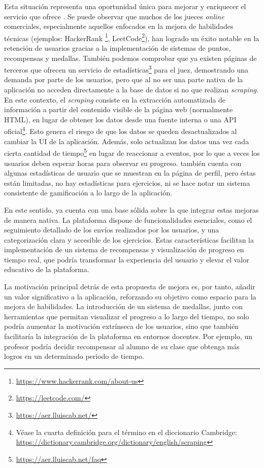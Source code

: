 Esta situación representa una oportunidad única para mejorar y enriquecer el servicio que ofrece \aer. Se puede observar que muchos de los jueces \textit{online} comerciales, especialmente aquellos enfocados en la mejora de habilidades técnicas (ejemplos: HackerRank \footnote{\url{https://www.hackerrank.com/about-us}}, LeetCode\footnote{\url{https://leetcode.com/}}), han logrado un éxito notable en la retención de usuarios gracias a la implementación de sistemas de puntos, recompensas y medallas. También podemos comprobar que ya existen páginas de terceros que ofrecen un servicio de estadísticas\footnote{\url{https://aer.lluiscab.net/}} para el juez, demostrando una demanda por parte de los usuarios, pero que al no ser una parte nativa de la aplicación no acceden directamente a la base de datos si no que realizan \textit{scraping}. En este contexto, el \textit{scraping} consiste en la extracción automatizada de información a partir del contenido visible de la página web (normalmente HTML), en lugar de obtener los datos desde una fuente interna o una API oficial\footnote{Véase la cuarta definición para el término en el diccionario Cambridge: \url{https://dictionary.cambridge.org/dictionary/english/scraping}}. Esto genera el riesgo de que los datos se queden desactualizados al cambiar la UI de la aplicación. Además, solo actualizan los datos una vez cada cierta cantidad de tiempo\footnote{\url{https://aer.lluiscab.net/faq}} en lugar de reaccionar a eventos, por lo que a veces los usuarios deben esperar horas para observar su progreso. \aer también cuenta con algunas estadísticas de usuario que se muestran en la página de perfil, pero éstas están limitadas, no hay estadísticas para ejercicios, ni se hace notar un sistema consistente de gamificación a lo largo de la aplicación.

En este sentido, \aer ya cuenta con una base sólida sobre la que integrar estas mejoras de manera nativa. La plataforma dispone de funcionalidades esenciales, como el seguimiento detallado de los envíos realizados por los usuarios, y una categorización clara y accesible de los ejercicios. Estas características facilitan la implementación de un sistema de recompensas y visualización de progreso en tiempo real, que podría transformar la experiencia del usuario y elevar el valor educativo de la plataforma.

La motivación principal detrás de esta propuesta de mejora es, por tanto, añadir un valor significativo a la aplicación, reforzando su objetivo como espacio para la mejora de habilidades. La introducción de un sistema de medallas, junto con herramientas que permitan visualizar el progreso a lo largo del tiempo, no solo podría aumentar la motivación extrínseca de los usuarios, sino que también facilitaría la integración de la plataforma en entornos docentes. Por ejemplo, un profesor podría decidir recompensar al alumno de su clase que obtenga más logros en un determinado periodo de tiempo.

